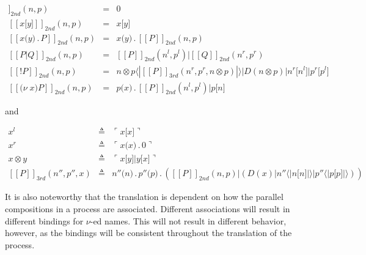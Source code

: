 \documentclass[]{entcs}
\newcommand{\ldb}{[\![}
\newcommand{\rdb}{]\!]}
\newcommand{\lliftb}{\langle\!|}
\newcommand{\rliftb}{|\!\rangle}
\newcommand{\lpquote}{\ulcorner}
\newcommand{\rpquote}{\urcorner}
\newcommand{\id}[1]{\texttt{#1}}
\newcommand{\pzero}{\mathbin{0}}
\newcommand{\juxtap}{\mathbin{\id{|}}}
\newcommand{\concat}{\mathbin{.}}
\newcommand{\binpar}[2]{#1 \juxtap #2}
\newcommand{\outputp}[2]{#1 \id{[} #2 \id{]}}
\newcommand{\prefix}[3]{#1 \id{(} #2 \id{)} \concat #3}
\newcommand{\lift}[2]{#1 \lliftb #2 \rliftb}
\newcommand{\quotep}[1]{\lpquote #1 \rpquote}
\newcommand{\meaningof}[1]{\ldb #1 \rdb}
\begin{document}
\begin{eqnarray}
   	\meaningof{\pzero}_{2nd} (  n, p )
   		& = &
   		 \pzero \nonumber\\
   	\meaningof{x \id{[} y \id{]}}_{2nd} (  n, p ) 
  		& = & 
  		x \id{[} y \id{]} \nonumber\\
   	\meaningof{x \id{(} y \id{)} \concat P}_{2nd} (  n, p ) 
   		& = & 
 		x \id{(} y \id{)} \concat \meaningof{P}_{2nd} (  n, p ) \nonumber\\
   	\meaningof{P \juxtap Q}_{2nd} (  n, p ) 
   		& = & 
 		\meaningof{P}_{2nd} ( n^{l}, p^{l} )
   			 \juxtap \meaningof{Q}_{2nd} ( n^{r}, p^{r} ) \nonumber\\
   	\meaningof{\id{!} P}_{2nd} (  n, p )
   		& = & {\lift{n \otimes p}{\meaningof{P}_{3rd}( n^{r}, p^{r}, n \otimes p )}}
		        \juxtap {\binpar{D(n \otimes p)}
						{\binpar{\outputp{n^{r}}{n^{l}}}{\outputp{p^{r}}{p^{l}}}}} \nonumber\\
   	\meaningof{\id{(}\nu \; x \id{)} P}_{2nd} (  n, p ) 
   		& = & 
 		\prefix{p}{x}{\binpar{\meaningof{P}_{2nd} ( n^{l}, p^{l} )}{\outputp{p}{n}}} \nonumber
\end{eqnarray}

and

\begin{eqnarray}
	x^{l} & \triangleq & \quotep{\outputp{x}{x}} \nonumber\\
	x^{r} & \triangleq & \quotep{\prefix{x}{x}{\pzero}} \nonumber\\
    x \otimes y & \triangleq & \quotep{\binpar{\outputp{x}{y}}{\outputp{y}{x}}} \nonumber\\
	\meaningof{P}_{3rd}( n'', p'', x ) 
		& \triangleq & 
			\prefix{n''}{n}{\prefix{p''}{p}{(\binpar{\meaningof{P}_{2nd}(  n, p )}
									{(\binpar{D(x)}{\binpar{\lift{n''}{\outputp{n}{n}}}{\lift{p''}{\outputp{p}{p}}}})})}} \nonumber
\end{eqnarray}
	
\begin{remark}
	It is also noteworthy that the translation is dependent on how
	the parallel compositions in a process are
	associated. Different associations will result in different
	bindings for $\nu$-ed names. This will not result in different
	behavior, however, as the bindings will be consistent
	throughout the translation of the process.
\end{remark}
\end{document}
